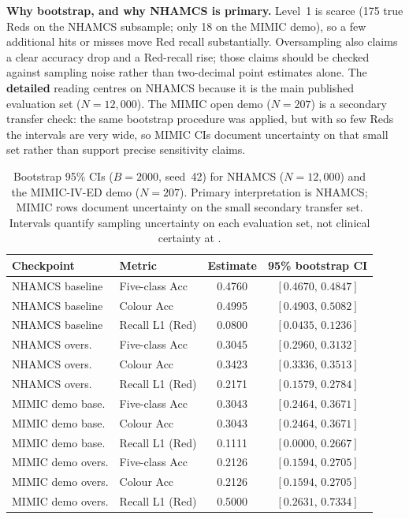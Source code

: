 \textbf{Why bootstrap, and why NHAMCS is primary.} Level~1 is scarce (175 true Reds on the NHAMCS subsample; only 18 on the MIMIC demo), so a few additional hits or misses move Red recall substantially. Oversampling also claims a clear accuracy drop and a Red-recall rise; those claims should be checked against sampling noise rather than two-decimal point estimates alone. The \textbf{detailed} reading centres on NHAMCS because it is the main published evaluation set (\(N=12{,}000\)). The MIMIC open demo (\(N=207\)) is a secondary transfer check: the same bootstrap procedure was applied, but with so few Reds the intervals are very wide, so MIMIC CIs document uncertainty on that small set rather than support precise sensitivity claims.

\begin{table}[H]
\centering
\footnotesize
\setlength{\tabcolsep}{3.5pt}
\begin{tabular}{|l|l|c|c|}
\hline
\textbf{Checkpoint} & \textbf{Metric} & \textbf{Estimate} & \textbf{95\% bootstrap CI} \\
\hline
NHAMCS baseline & Five-class Acc & 0.4760 & \([0.4670,\,0.4847]\) \\
NHAMCS baseline & Colour Acc & 0.4995 & \([0.4903,\,0.5082]\) \\
NHAMCS baseline & Recall L1 (Red) & 0.0800 & \([0.0435,\,0.1236]\) \\
\hline
NHAMCS overs. & Five-class Acc & 0.3045 & \([0.2960,\,0.3132]\) \\
NHAMCS overs. & Colour Acc & 0.3423 & \([0.3336,\,0.3513]\) \\
NHAMCS overs. & Recall L1 (Red) & 0.2171 & \([0.1579,\,0.2784]\) \\
\hline
MIMIC demo base. & Five-class Acc & 0.3043 & \([0.2464,\,0.3671]\) \\
MIMIC demo base. & Colour Acc & 0.3043 & \([0.2464,\,0.3671]\) \\
MIMIC demo base. & Recall L1 (Red) & 0.1111 & \([0.0000,\,0.2667]\) \\
\hline
MIMIC demo overs. & Five-class Acc & 0.2126 & \([0.1594,\,0.2705]\) \\
MIMIC demo overs. & Colour Acc & 0.2126 & \([0.1594,\,0.2705]\) \\
MIMIC demo overs. & Recall L1 (Red) & 0.5000 & \([0.2631,\,0.7334]\) \\
\hline
\end{tabular}
\caption{Bootstrap 95\% CIs (\(B=2000\), seed~42) for NHAMCS (\(N=12{,}000\)) and the MIMIC-IV-ED demo (\(N=207\)). Primary interpretation is NHAMCS; MIMIC rows document uncertainty on the small secondary transfer set. Intervals quantify sampling uncertainty on each evaluation set, not clinical certainty at \examplehospital{}.}
\label{tab:bootstrap-cis}
\end{table}

